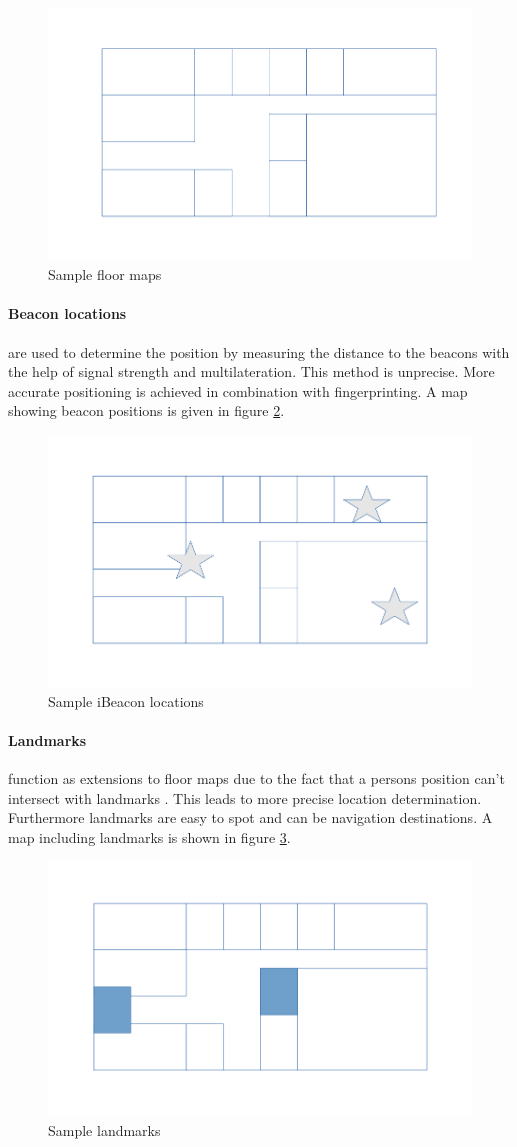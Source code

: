 \begin{figure}[h]
	\centering
		\includegraphics[width=.5\textwidth]{images/floorMap.png}
	\caption{Sample floor maps \parencite{mapCraft}}
	\label{fig:floorMaps}
\end{figure}

\paragraph{Beacon locations} are used to determine the position by measuring the distance to the beacons with the help of signal strength and multilateration. This method is unprecise. More accurate positioning is achieved in combination with fingerprinting. A map showing beacon positions is given in figure \ref{fig:beacon}.

\begin{figure}[h]
	\centering
		\includegraphics[width=.5\textwidth]{images/apLocations.png}
	\caption{Sample iBeacon locations \parencite{mapCraft}}
	\label{fig:beacon}
\end{figure}

\paragraph{Landmarks} function as extensions to floor maps due to the fact that a persons position can't intersect with landmarks \parencite{mapCraft}. This leads to more precise location determination. Furthermore landmarks are easy to spot and can be navigation destinations. A map including landmarks is shown in figure \ref{fig:landmarks}.

\begin{figure}[h]
	\centering
		\includegraphics[width=.5\textwidth]{images/landmarks.png}
	\caption{Sample landmarks \parencite{mapCraft}}
	\label{fig:landmarks}
\end{figure}

